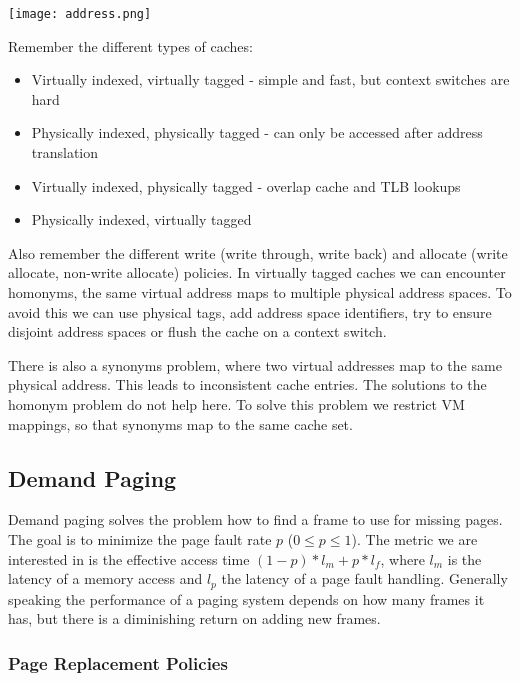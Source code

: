 \begin{center}
	\texttt{[image: address.png]}
\end{center}

Remember the different types of caches:
\begin{itemize}
	\item Virtually indexed, virtually tagged - simple and fast, but context switches are hard
	\item Physically indexed, physically tagged - can only be accessed after address translation
	\item Virtually indexed, physically tagged - overlap cache and TLB lookups
	\item Physically indexed, virtually tagged
\end{itemize}

Also remember the different write (write through, write back) and allocate (write allocate, non-write allocate) policies. In virtually tagged caches we can encounter homonyms, the same virtual address maps to multiple physical address spaces. To avoid this we can use physical tags, add address space identifiers, try to ensure disjoint address spaces or flush the cache on a context switch. \medskip

There is also a synonyms problem, where two virtual addresses map to the same physical address. This leads to inconsistent cache entries. The solutions to the homonym problem do not help here. To solve this problem we restrict VM mappings, so that synonyms map to the same cache set. 


\subsection{Demand Paging}

Demand paging solves the problem how to find a frame to use for missing pages. The goal is to minimize the page fault rate $p$ ($0 \leq p \leq 1$). The metric we are interested in is the effective access time $(1-p) * l_m + p * l_f$, where $l_m$ is the latency of a memory access and $l_p$ the latency of a page fault handling. Generally speaking the performance of a paging system depends on how many frames it has, but there is a diminishing return on adding new frames.

\subsubsection{Page Replacement Policies}

